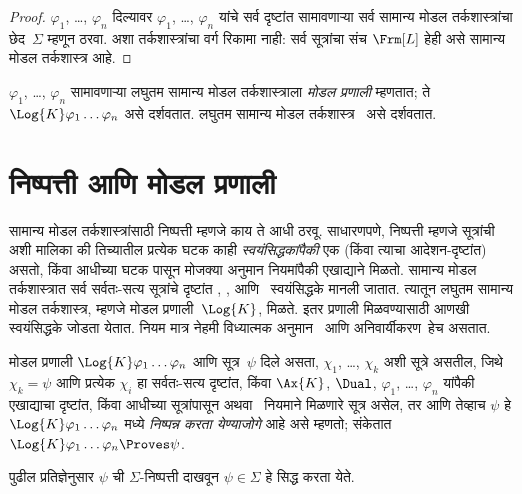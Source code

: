 \begin{proof}
  $\varphi_1$, \dots, $\varphi_n$ दिल्यावर
  $\varphi_1$, \dots, $\varphi_n$ यांचे सर्व दृष्टांत सामावणाऱ्या
  सर्व सामान्य मोडल तर्कशास्त्रांचा
  छेद~$\Sigma$ म्हणून ठरवा. अशा तर्कशास्त्रांचा
  वर्ग रिकामा नाही: सर्व सूत्रांचा संच
  $\Frm[L]$ हेही असे सामान्य मोडल तर्कशास्त्र आहे.
\end{proof}

\begin{defn}
$\varphi_1$, \dots, $\varphi_n$ सामावणाऱ्या लघुतम
सामान्य मोडल तर्कशास्त्राला \emph{मोडल प्रणाली}
म्हणतात; ते $\Log{K} \varphi_1 \dots
\varphi_n$ असे दर्शवतात. लघुतम सामान्य मोडल
तर्कशास्त्र~ असे दर्शवतात.
\end{defn}












\section{निष्पत्ती आणि मोडल प्रणाली}\label{nml:prf:prf:sec}

सामान्य मोडल तर्कशास्त्रांसाठी निष्पत्ती
म्हणजे काय ते आधी ठरवू. साधारणपणे,
निष्पत्ती म्हणजे सूत्रांची अशी मालिका
की तिच्यातील प्रत्येक घटक काही
\emph{स्वयंसिद्धकांपैकी} एक (किंवा त्याचा आदेशन-दृष्टांत)
असतो, किंवा आधीच्या घटक पासून मोजक्या
अनुमान नियमांपैकी एखाद्याने मिळतो. सामान्य मोडल
तर्कशास्त्रात सर्व सर्वतः-सत्य सूत्रांचे दृष्टांत
, , आणि~\Dual{}
स्वयंसिद्धके मानली जातात. त्यातून लघुतम सामान्य
मोडल तर्कशास्त्र, म्हणजे मोडल प्रणाली~$\Log{K}$,
मिळते. इतर प्रणाली मिळवण्यासाठी आणखी स्वयंसिद्धके
जोडता येतात. नियम मात्र नेहमी विध्यात्मक अनुमान~\MP{}
आणि अनिवार्यीकरण~\Nec हेच असतात.

\begin{defn}
  मोडल प्रणाली $\Log{K} \varphi_1 \dots \varphi_n$ आणि
  सूत्र~$\psi$ दिले असता, $\chi_1$, \dots,
  $\chi_k$ अशी सूत्रे असतील, जिथे $\chi_k = \psi$
  आणि प्रत्येक $\chi_i$ हा सर्वतः-सत्य दृष्टांत,
  किंवा $\Ax{K}$, $\Dual$,
  $\varphi_1$, \dots, $\varphi_n$ यांपैकी एखाद्याचा दृष्टांत,
  किंवा आधीच्या सूत्रांपासून \MP{} अथवा~\Nec
  नियमाने मिळणारे सूत्र असेल, तर आणि तेव्हाच
  $\psi$ हे $\Log{K} \varphi_1 \dots
  \varphi_n$ मध्ये \emph{निष्पन्न करता येण्याजोगे} आहे असे म्हणतो;
  संकेतात $\Log{K} \varphi_1 \dots \varphi_n \Proves \psi$.
\end{defn}

पुढील प्रतिज्ञेनुसार $\psi$ ची $\Sigma$-निष्पत्ती
दाखवून $\psi \in \Sigma$ हे सिद्ध करता येते.

